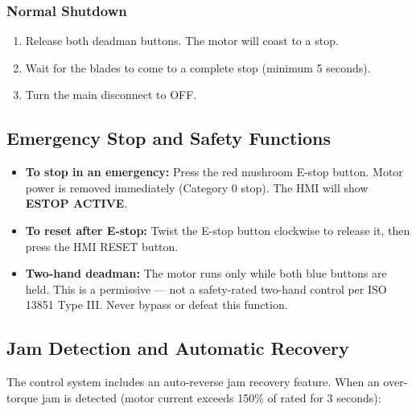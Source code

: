 \documentclass[hidelinks,12pt]{article}
\begin{document}
\subsubsection{Normal Shutdown}
\begin{enumerate}
    \item Release both deadman buttons. The motor will coast to a stop.
    \item Wait for the blades to come to a complete stop (minimum 5 seconds).
    \item Turn the main disconnect to OFF.
\end{enumerate}

\subsection{Emergency Stop and Safety Functions}
\begin{itemize}
    \item \textbf{To stop in an emergency:} Press the red mushroom E-stop button. Motor power is removed immediately (Category 0 stop). The HMI will show \textbf{ESTOP ACTIVE}.
    \item \textbf{To reset after E-stop:} Twist the E-stop button clockwise to release it, then press the HMI RESET button.
    \item \textbf{Two-hand deadman:} The motor runs only while both blue buttons are held. This is a permissive — not a safety-rated two-hand control per ISO 13851 Type III. Never bypass or defeat this function.
\end{itemize}

\subsection{Jam Detection and Automatic Recovery}
The control system includes an auto-reverse jam recovery feature. When an over-torque jam is detected (motor current exceeds 150\% of rated for 3 seconds):
\end{document}
